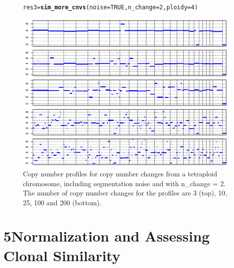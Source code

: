 \documentclass[12pt]{article}\usepackage[]{graphicx}\usepackage[]{color}
\makeatletter
\newcommand{\hlnum}[1]{\textcolor[rgb]{0.686,0.059,0.569}{#1}}%
\newcommand{\hlstd}[1]{\textcolor[rgb]{0.345,0.345,0.345}{#1}}%
\newcommand{\hlkwb}[1]{\textcolor[rgb]{0.69,0.353,0.396}{#1}}%
\newcommand{\hlkwc}[1]{\textcolor[rgb]{0.333,0.667,0.333}{#1}}%
\newcommand{\hlkwd}[1]{\textcolor[rgb]{0.737,0.353,0.396}{\textbf{#1}}}%
\newenvironment{kframe}{%
 \def\at@end@of@kframe{}%
 \ifinner\ifhmode%
  \def\at@end@of@kframe{\end{minipage}}%
  \begin{minipage}{\columnwidth}%
 \fi\fi%
 \def\FrameCommand##1{\hskip\@totalleftmargin \hskip-\fboxsep
 \colorbox{shadecolor}{##1}\hskip-\fboxsep
     \hskip-\linewidth \hskip-\@totalleftmargin \hskip\columnwidth}%
 \MakeFramed {\advance\hsize-\width
   \@totalleftmargin\z@ \linewidth\hsize
   \@setminipage}}%
 {\par\unskip\endMakeFramed%
 \at@end@of@kframe}
\newenvironment{knitrout}{}{} %
\makeatother
\begin{document}
\begin{figure}[h!]
  \centering
\begin{knitrout}
\color{fgcolor}\begin{kframe}
\begin{alltt}
\hlstd{res3} \hlkwb{=} \hlkwd{sim_more_cnvs}\hlstd{(} \hlkwc{noise}\hlstd{=}\hlnum{TRUE}\hlstd{,} \hlkwc{n_change}\hlstd{=}\hlnum{2}\hlstd{,} \hlkwc{ploidy}\hlstd{=}\hlnum{4}\hlstd{)}
\end{alltt}
\end{kframe}
\includegraphics[width=.95\linewidth]{figure/unnamed-chunk-7-1} 

\end{knitrout}
\caption{Copy number profiles for copy number changes from a tetraploid chromosome, including segmentation noise and with n\_change = 2. The number of copy number changes for the profiles are 3 (top), 10, 25, 100 and 200 (bottom).}
\label{fig:tetraploid}
\end{figure}

\newpage

\section*{5\quad Normalization and Assessing Clonal Similarity}
\end{document}
